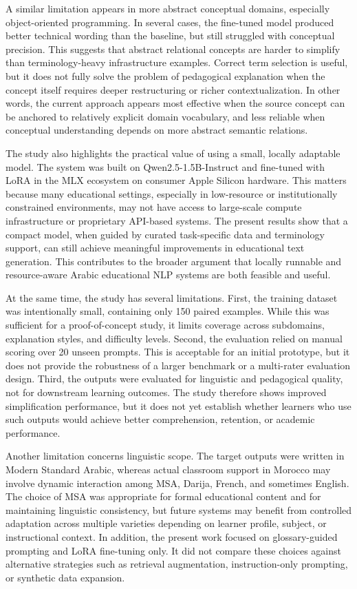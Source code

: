 \documentclass[education,article,submit,moreauthors]{Definitions/mdpi}
\begin{document}
A similar limitation appears in more abstract conceptual domains, especially object-oriented programming. In several cases, the fine-tuned model produced better technical wording than the baseline, but still struggled with conceptual precision. This suggests that abstract relational concepts are harder to simplify than terminology-heavy infrastructure examples. Correct term selection is useful, but it does not fully solve the problem of pedagogical explanation when the concept itself requires deeper restructuring or richer contextualization. In other words, the current approach appears most effective when the source concept can be anchored to relatively explicit domain vocabulary, and less reliable when conceptual understanding depends on more abstract semantic relations.

The study also highlights the practical value of using a small, locally adaptable model. The system was built on Qwen2.5-1.5B-Instruct and fine-tuned with LoRA in the MLX ecosystem on consumer Apple Silicon hardware. This matters because many educational settings, especially in low-resource or institutionally constrained environments, may not have access to large-scale compute infrastructure or proprietary API-based systems. The present results show that a compact model, when guided by curated task-specific data and terminology support, can still achieve meaningful improvements in educational text generation. This contributes to the broader argument that locally runnable and resource-aware Arabic educational NLP systems are both feasible and useful.

At the same time, the study has several limitations. First, the training dataset was intentionally small, containing only 150 paired examples. While this was sufficient for a proof-of-concept study, it limits coverage across subdomains, explanation styles, and difficulty levels. Second, the evaluation relied on manual scoring over 20 unseen prompts. This is acceptable for an initial prototype, but it does not provide the robustness of a larger benchmark or a multi-rater evaluation design. Third, the outputs were evaluated for linguistic and pedagogical quality, not for downstream learning outcomes. The study therefore shows improved simplification performance, but it does not yet establish whether learners who use such outputs would achieve better comprehension, retention, or academic performance.

Another limitation concerns linguistic scope. The target outputs were written in Modern Standard Arabic, whereas actual classroom support in Morocco may involve dynamic interaction among MSA, Darija, French, and sometimes English. The choice of MSA was appropriate for formal educational content and for maintaining linguistic consistency, but future systems may benefit from controlled adaptation across multiple varieties depending on learner profile, subject, or instructional context. In addition, the present work focused on glossary-guided prompting and LoRA fine-tuning only. It did not compare these choices against alternative strategies such as retrieval augmentation, instruction-only prompting, or synthetic data expansion.
\end{document}
